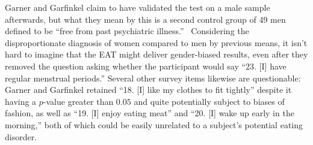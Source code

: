 \documentclass[11pt]{article}
\begin{document}
    Garner and Garfinkel claim to have validated the test on a male sample afterwards, but what they mean by this is a second control group of 49 men defined to be ``free from past psychiatric illness.''~\autocite[273]{Garner79} Considering the disproportionate diagnosis of women compared to men by previous means, it isn't hard to imagine that the EAT might deliver gender-biased results, even after they removed the question asking whether the participant would say ``23. [I] have regular menstrual periods.'' Several other survey items likewise are questionable: Garner and Garfinkel retained ``18. [I] like my clothes to fit tightly'' despite it having a $p$-value greater than $0.05$ and quite potentially subject to biases of fashion, as well as ``19. [I] enjoy eating meat'' and ``20. [I] wake up early in the morning,'' both of which could be easily unrelated to a subject's potential eating disorder.
\end{document}
